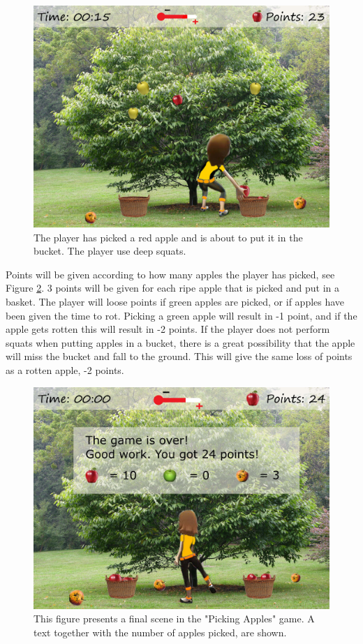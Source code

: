 \begin{figure} [H]
\centering
\includegraphics[scale=0.1]{squatppletreeEng.jpg}
\caption[Picking apples - squats]{The player has picked a red apple and is about to put it in the bucket. The player use deep squats.}
\label{fig:appleSquat}
\end{figure}

Points will be given according to how many apples the player has picked, see Figure \ref{fig:appleOver}. 3 points will be given for each ripe apple that is picked and put in a basket. The player will loose points if green apples are picked, or if apples have been given the time to rot. Picking a green apple will result in -1 point, and if the apple gets rotten this will result in -2 points. If the player does not perform squats when putting apples in a bucket, there is a great possibility that the apple will miss the bucket and fall to the ground. This will give the same loss of points as a rotten apple, -2 points.       

\begin{figure} [H]
\centering
\includegraphics[scale=0.1]{appletreeendEng.jpg}
\caption[Picking apples - points]{This figure presents a final scene in the "Picking Apples" game. A text together with the number of apples picked, are shown.}
\label{fig:appleOver}
\end{figure}

